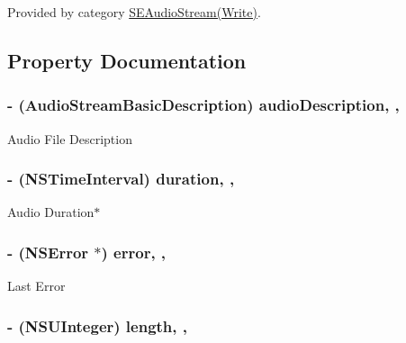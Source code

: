 Provided by category \hyperlink{category_s_e_audio_stream_07_write_08_a72236de5f14e8c3494be78f310d4282a}{S\-E\-Audio\-Stream(\-Write)}.



\subsection{Property Documentation}
\hypertarget{interface_s_e_audio_stream_a5c43770f8936fa054d438771cb329bab}{
\subsubsection[{audio\-Description}]{\setlength{\rightskip}{0pt plus 5cm}-\/ (Audio\-Stream\-Basic\-Description) audio\-Description\hspace{0.3cm}{\ttfamily [read]}, {\ttfamily [nonatomic]}, {\ttfamily [assign]}}}\label{interface_s_e_audio_stream_a5c43770f8936fa054d438771cb329bab}
Audio File Description \hypertarget{interface_s_e_audio_stream_af5e4493693cf24fa25af34487993d693}{
\subsubsection[{duration}]{\setlength{\rightskip}{0pt plus 5cm}-\/ (N\-S\-Time\-Interval) duration\hspace{0.3cm}{\ttfamily [read]}, {\ttfamily [nonatomic]}, {\ttfamily [assign]}}}\label{interface_s_e_audio_stream_af5e4493693cf24fa25af34487993d693}
Audio Duration$\ast$ \hypertarget{interface_s_e_audio_stream_adbfea649836caa8559708a933f907536}{
\subsubsection[{error}]{\setlength{\rightskip}{0pt plus 5cm}-\/ (N\-S\-Error $\ast$) error\hspace{0.3cm}{\ttfamily [read]}, {\ttfamily [nonatomic]}, {\ttfamily [assign]}}}\label{interface_s_e_audio_stream_adbfea649836caa8559708a933f907536}
Last Error \hypertarget{interface_s_e_audio_stream_a1fd4decb2fec74b1fe26c3805a02999b}{
\subsubsection[{length}]{\setlength{\rightskip}{0pt plus 5cm}-\/ (N\-S\-U\-Integer) length\hspace{0.3cm}{\ttfamily [read]}, {\ttfamily [nonatomic]}, {\ttfamily [assign]}}}\label{interface_s_e_audio_stream_a1fd4decb2fec74b1fe26c3805a02999b}
